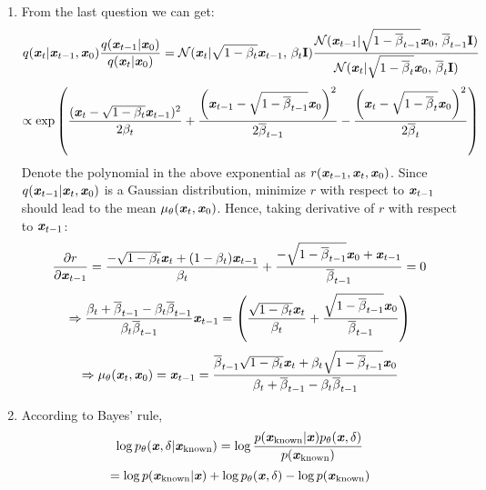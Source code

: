 \documentclass[12pt]{article}
\begin{document}
\begin{enumerate}
    \item From the last question we can get:
    \[q(\textbf{\textit{x}}_t|\textbf{\textit{x}}_{t-1},\textbf{\textit{x}}_0)\frac{q(\textbf{\textit{x}}_{t-1}|\textbf{\textit{x}}_0)}{q(\textbf{\textit{x}}_t|\textbf{\textit{x}}_0)} = \mathcal{N}(\textbf{\textit{x}}_t | \sqrt{1-\beta_t}\textbf{\textit{x}}_{t-1},\,\beta_t\mathbf{I})\frac{\mathcal{N}(\textbf{\textit{x}}_{t-1} | \sqrt{1-\overline{\beta}_{t-1}}\textbf{\textit{x}}_0,\,\overline{\beta}_{t-1}\mathbf{I})}{\mathcal{N}(\textbf{\textit{x}}_t | \sqrt{1-\overline{\beta}_t}\textbf{\textit{x}}_0,\,\overline{\beta}_t\mathbf{I})}\]
    \[\propto\exp\left(\frac{(\textbf{\textit{x}}_t - \sqrt{1-\beta_t}\textbf{\textit{x}}_{t-1})^2}{2\beta_t} + \frac{\left(\textbf{\textit{x}}_{t-1} - \sqrt{1-\overline{\beta}_{t-1}}\textbf{\textit{x}}_0\right)^2}{2\overline{\beta}_{t-1}} - \frac{\left(\textbf{\textit{x}}_{t} - \sqrt{1-\overline{\beta}_{t}}\textbf{\textit{x}}_0\right)^2}{2\overline{\beta}_{t}}\right)\]
    Denote the polynomial in the above exponential as $r(\textbf{\textit{x}}_{t-1}, \textbf{\textit{x}}_t, \textbf{\textit{x}}_0)$. Since $q(\textbf{\textit{x}}_{t-1}|\textbf{\textit{x}}_t,\textbf{\textit{x}}_0)$ is a Gaussian distribution, minimize $r$ with respect to $\textbf{\textit{x}}_{t-1}$ should lead to the mean $\mu_\theta(\textbf{\textit{x}}_t,\textbf{\textit{x}}_0)$. Hence, taking derivative of $r$ with respect to $\textbf{\textit{x}}_{t-1}$:
    \[\frac{\partial r}{\partial \textbf{\textit{x}}_{t-1}} = \frac{-\sqrt{1-\beta_t}\textbf{\textit{x}}_t + (1-\beta_t)\textbf{\textit{x}}_{t-1}}{\beta_t} + \frac{-\sqrt{1-\overline{\beta}_{t-1}}\textbf{\textit{x}}_{0} + \textbf{\textit{x}}_{t-1}}{\overline{\beta}_{t-1}} = 0\]
    \[\Rightarrow \frac{\beta_t+\overline{\beta}_{t-1}-\beta_t\overline{\beta}_{t-1}}{\beta_t\overline{\beta}_{t-1}}\textbf{\textit{x}}_{t-1} = \left(\frac{\sqrt{1-\beta_t}\textbf{\textit{x}}_t}{\beta_t} + \frac{\sqrt{1-\overline{\beta}_{t-1}}\textbf{\textit{x}}_0}{\overline{\beta}_{t-1}}\right)\]
    \[\Rightarrow \mu_\theta(\textbf{\textit{x}}_t,\textbf{\textit{x}}_0) = \textbf{\textit{x}}_{t-1} = \frac{\overline{\beta}_{t-1}\sqrt{1-\beta_t}\textbf{\textit{x}}_t + \beta_t\sqrt{1-\overline{\beta}_{t-1}}\textbf{\textit{x}}_0}{\beta_t+\overline{\beta}_{t-1}-\beta_t\overline{\beta}_{t-1}}\]

    \item According to Bayes' rule, 
    \[\log p_\theta(\textbf{\textit{x}},\delta|\textbf{\textit{x}}_\text{known}) = \log\frac{p(\textbf{\textit{x}}_\text{known}|\textbf{\textit{x}})p_\theta(\textbf{\textit{x}},\delta)}{p(\textbf{\textit{x}}_\text{known})}\] 
    \[= \log p(\textbf{\textit{x}}_\text{known}|\textbf{\textit{x}}) + \log p_\theta(\textbf{\textit{x}},\delta) - \log p(\textbf{\textit{x}}_\text{known})\]
\end{enumerate}
\newpage
\end{document}
